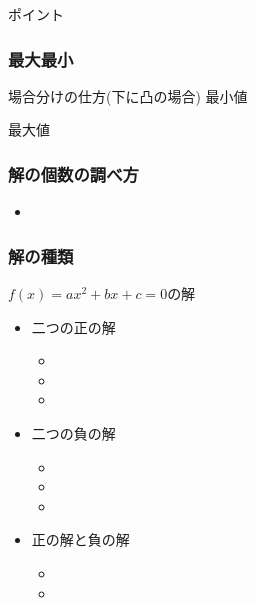 \documentclass[10pt,dvipdfmx]{jsarticle}
\begin{document}
\begin{itembox}[l]{ポイント}
  \vspace{8mm}
\end{itembox}



\subsubsection*{最大最小}
\begin{itembox}[l]{場合分けの仕方(下に凸の場合)}
  最小値
  \vspace{5cm}

  最大値\vspace{5cm}


\end{itembox}

\subsubsection*{解の個数の調べ方}
\begin{large}
  \begin{itemize}
    \item
  \end{itemize}
\end{large}

\subsubsection*{解の種類}
$f(x)=ax^2+bx+c=0$の解
\begin{multicols}{3}
  \begin{large}
    \begin{itemize}
      \item 二つの正の解
            \begin{itemize}
              \item \item \item
            \end{itemize}
      \item 二つの負の解
            \begin{itemize}
              \item \item \item
            \end{itemize}
      \item 正の解と負の解
            \begin{itemize}
              \item \item
            \end{itemize}
    \end{itemize}
  \end{large}
\end{multicols}
\end{document}
